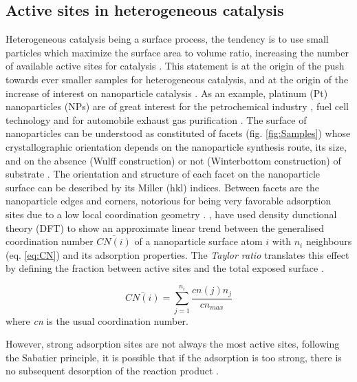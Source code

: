 \subsection{Active sites in heterogeneous catalysis}

Heterogeneous catalysis being a surface process, the tendency is to use small particles which maximize the surface area to volume ratio, increasing the number of available active sites for catalysis \parencite{Vogt2022}.
This statement is at the origin of the push towards ever smaller samples for heterogeneous catalysis, and at the origin of the increase of interest on nanoparticle catalysis \parencite{CHE1989, Molenbroek2009, vanSanten2010, Schauermann2013}.
As an example, platinum (Pt) nanoparticles (NPs) are of great interest for the petrochemical industry \parencite{Astruc2005}, fuel cell technology and for automobile exhaust gas purification \parencite{HECK2001}.
The surface of nanoparticles can be understood as constituted of facets (fig. \ref{fig:Samples}) whose crystallographic orientation depends on the nanoparticle synthesis route, its size, and on the absence (Wulff construction) or not (Winterbottom construction) of substrate \parencite{WINTERBOTTOM1967, Boukouvala2021}.
The orientation and structure of each facet on the nanoparticle surface can be described by its Miller (hkl) indices.
Between facets are the nanoparticle edges and corners, notorious for being very favorable adsorption sites due to a low local coordination geometry \parencite{Jiang2009}.
\cite{CalleVallejo2014}, \cite*{CalleVallejo2018} have used density dunctional theory (DFT) to show an approximate linear trend between the generalised coordination number $\bar{CN(i)}$ of a nanoparticle surface atom $i$ with $n_i$ neighbours (eq. \ref{eq:CN}) and its adsorption properties.
The \textit{Taylor ratio} translates this effect by defining the fraction between active sites and the total exposed surface \parencite{Taylor1925}.

\begin{equation}
    \bar{CN(i)} = \sum_{j=1}^{n_i} \frac{cn(j) n_j}{cn_{max}}
    \label{eq:CN}
\end{equation}
where \textit{cn} is the usual coordination number.%

However, strong adsorption sites are not always the most active sites, following the Sabatier principle, it is possible that if the adsorption is too strong, there is no subsequent desorption of the reaction product \parencite{Nilsson2005, Jiang2009}.

